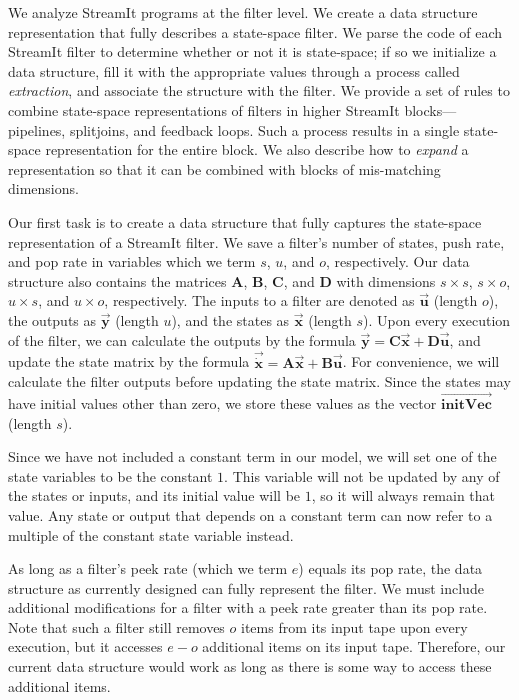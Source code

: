 \label{sec:statespace}

  We analyze StreamIt programs at the filter level. We create a data
structure representation that fully describes a state-space filter. We
parse the code of each StreamIt filter to determine whether or not it
is state-space; if so we initialize a data structure, fill it with the
appropriate values through a process called \emph{extraction}, and
associate the structure with the filter. We provide a set of rules to
combine state-space representations of filters in higher StreamIt
blocks---pipelines, splitjoins, and feedback loops. Such a process
results in a single state-space representation for the entire block.
We also describe how to \emph{expand} a representation so that it can
be combined with blocks of mis-matching dimensions.


    Our first task is to create a data structure that fully captures
the state-space representation of a StreamIt filter.  We save a
filter's number of states, push rate, and pop rate in variables
which we term $s$, $u$, and $o$, respectively. Our data structure
also contains the matrices $\mathbf{A}$, $\mathbf{B}$,
$\mathbf{C}$, and $\mathbf{D}$ with dimensions $s \times s$, $s
\times o$, $u \times s$, and $u \times o$, respectively. The
inputs to a filter are denoted as $\vec{\mathbf{u}}$ (length $o$),
the outputs as $\vec{\mathbf{y}}$ (length $u$), and the states as
$\vec{\mathbf{x}}$ (length $s$). Upon every execution of the
filter, we can calculate the outputs by the formula
$\vec{\mathbf{y}} = \mathbf{C}\vec{\mathbf{x}} +
\mathbf{D}\vec{\mathbf{u}}$, and update the state matrix by the
formula $\vec{\dot{\mathbf{x}}} = \mathbf{A}\vec{\mathbf{x}} +
\mathbf{B}\vec{\mathbf{u}}$. For convenience, we will calculate
the filter outputs before updating the state matrix. Since the
states may have initial values other than zero, we store these
values as the vector $\overrightarrow{\mathbf{initVec}}$ (length
$s$).

    Since we have not included a constant term in our model, we
will set one of the state variables to be the constant $1$. This
variable will not be updated by any of the states or inputs, and
its initial value will be $1$, so it will always remain that
value. Any state or output that depends on a constant term can now
refer to a multiple of the constant state variable instead.

    As long as a filter's peek rate (which we term $e$) equals its pop
rate, the data structure as currently designed can fully represent
the filter. We must include additional modifications for a filter
with a peek rate greater than its pop rate. Note that such a
filter still removes $o$ items from its input tape upon every
execution, but it accesses $e-o$ additional items on its input
tape. Therefore, our current data structure would work as long as
there is some way to access these additional items.

